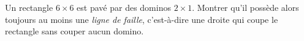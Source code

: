 Un rectangle $6 \times 6$ est pavé par des dominos $2 \times 1$. Montrer qu'il possède alors toujours au moins une \emph{ligne de faille}, c'est-à-dire une droite qui coupe le rectangle sans couper aucun domino.
